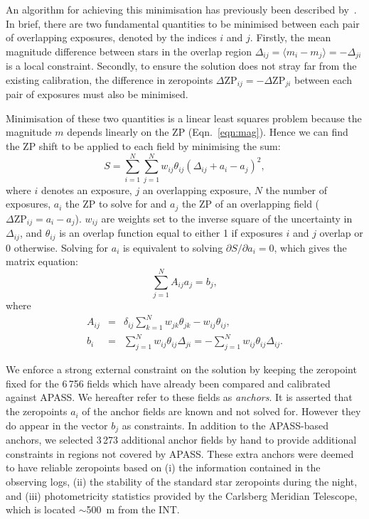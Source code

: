 \documentclass[useAMS,usenatbib]{mn2e}
\begin{document}
An algorithm for achieving this minimisation
has previously been described by~\citet{Glazebrook1994}.
In brief, there are two fundamental quantities to be
minimised between each pair of overlapping exposures, 
denoted by the indices $i$ and $j$. 
Firstly, the mean magnitude difference between stars in the overlap
region $\Delta_{ij}=\langle m_i-m_j\rangle=-\Delta_{ji}$ is a local
constraint. 
Secondly, to ensure the solution does not stray far 
from the existing calibration, 
the difference in zeropoints 
$\Delta\mathrm{ZP}_{ij}=-\Delta\mathrm{ZP}_{ji}$ 
between each pair of exposures must also be minimised.

Minimisation of these two quantities is a linear least squares problem 
because the magnitude $m$ depends linearly on the ZP (Eqn.~\ref{eqn:mag}).
Hence we can find the ZP shift to be applied to each field 
by minimising the sum:
\begin{equation}
   S = \sum_{i=1}^N \sum_{j=1}^N w_{ij} \theta_{ij} (\Delta_{ij} + a_i - a_j)^2,
   \label{eqn:chi2}
\end{equation}
where $i$ denotes an exposure, 
$j$ an overlapping exposure, 
$N$ the number of exposures,
$a_i$ the ZP to solve for 
and $a_j$ the ZP of an overlapping field ($\Delta\mathrm{ZP}_{ij}=a_i-a_j$). 
$w_{ij}$ are weights set to the inverse square of the uncertainty in $\Delta_{ij}$,
and $\theta_{ij}$ is an overlap function 
equal to either 1 if exposures $i$ and $j$ overlap or 0 otherwise. 
Solving for $a_i$ is equivalent to solving $\partial
S/\partial a_i=0$, which gives the matrix equation:
\begin{equation}
   \sum_{j=1}^N A_{ij} a_j = b_j,
   \label{eqn:matrix}
\end{equation}
where 
\begin{eqnarray}
   A_{ij} &=& \delta_{ij} \sum_{k=1}^N w_{jk}\theta_{jk} - w_{ij} \theta_{ij},\label{eqn:aij}\\
   b_i &=& \sum_{j=1}^N w_{ij} \theta_{ij}\Delta_{ji} = -\sum_{j=1}^N w_{ij} \theta_{ij}\Delta_{ij}.\label{eqn:bi}
\end{eqnarray}

We enforce a strong external constraint
on the solution by keeping the zeropoint fixed 
for the 6\,756 fields which have already been compared
and calibrated against APASS.
We hereafter refer to these fields as \emph{anchors}.
It is asserted that the zeropoints $a_i$ of the anchor fields 
are known and not solved for.  However they do appear in the vector 
$b_j$ as constraints.  In addition to the APASS-based anchors, 
we selected 3\,273 additional anchor fields by hand
to provide additional constraints in regions not covered by APASS.
These extra anchors were deemed to have reliable zeropoints 
based on 
(i) the information contained in the observing logs,
(ii) the stability of the standard star zeropoints during the night, and
(iii) photometricity statistics provided by the Carlsberg Meridian Telescope,
which is located $\sim$500~m from the INT.
\end{document}

